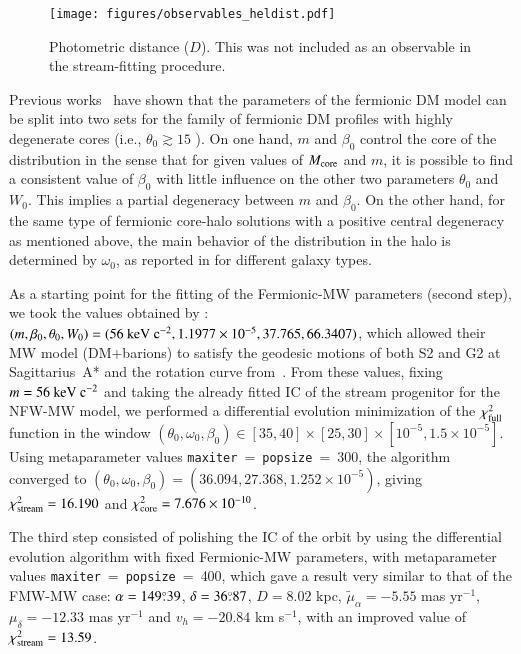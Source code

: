 \documentclass[twocolumn]{aa}
\begin{document}
\begin{figure}
   \texttt{[image: figures/observables\_heldist.pdf]}
   \caption{Photometric distance ($D$). This was not included as an observable in the stream-fitting procedure.}
   \label{fig:obs_radial}
\end{figure}
Previous works~\citep{arguelles_novel_2018,2019PDU....24..278A,2023ApJ...945....1K} have shown that the parameters of the fermionic DM model can be split into two sets for the family of fermionic DM profiles with highly degenerate cores (i.e., $\theta_0 \gtrsim 15$ \citealp{2019PDU....24..278A}). On one hand, $m$ and $\beta_0$ control the core of the distribution in the sense that for given values of $M_{\rm{core}}$ and $m$, it is possible to find a consistent value of $\beta_0$ with little influence on the other two parameters $\theta_0$ and $W_0$. This implies a partial degeneracy between $m$ and $\beta_0$.
On the other hand, for the same type of fermionic core-halo solutions with a positive central degeneracy as mentioned above, the main behavior of the distribution in the halo is determined by $\omega_0$, as reported in \cite{2019PDU....24..278A} for different galaxy types.

As a starting point for the fitting of the Fermionic-MW parameters (second step), we took the values obtained by \citet{2020A&A...641A..34B}: $(m, \beta_0, \theta_0, W_0)=(56~\rm{keV}~c^{-2}, 1.1977\times10^{-5}, 37.765, 66.3407)$, which allowed their MW model (DM+barions) to satisfy the geodesic motions of both S2 and G2 at Sagittarius~A* and the rotation curve from~\citet{sofue_rotation_2013}.
From these values, fixing $m=56~\rm{keV}~c^{-2}$ and taking the already fitted IC of the stream progenitor for the NFW-MW model, we performed a differential evolution minimization of the
$\chi^2_{\rm{full}}$ function in the window
$(\theta_0,\omega_0, \beta_0)\in [35, 40]\times[25, 30]\times[10^{-5}, 1.5\times10^{-5}]$. Using metaparameter values \texttt{maxiter}$~=~$\texttt{popsize}$~=~$300, the algorithm converged to
$(\theta_0, \omega_0, \beta_0)= (36.094, 27.368 , 1.252\times10^{-5})$, giving
$\chi^2_{\rm{stream}}= 16.190$ and  $\chi^2_{\rm{core}}= 7.676\times10^{-10}$.

The third step consisted of polishing the IC of the orbit by using the differential evolution algorithm with fixed Fermionic-MW parameters, with metaparameter values \texttt{maxiter}$~=~$\texttt{popsize}$~=~$400, which gave a result very similar to that of the FMW-MW case:
$\alpha=149\overset{\circ}{.} 39$, $\delta=36\overset{\circ}{.} 87$, $D=8.02$ kpc,
$\tilde{\mu}_\alpha=-5.55$ mas yr$^{-1}$, $\mu_\delta=-12.33$ mas yr$^{-1}$ and $v_h=-20.84$ km s$^{-1}$, with an improved value of $\chi^2_{\rm{stream}}= 13.59$.
\end{document}
